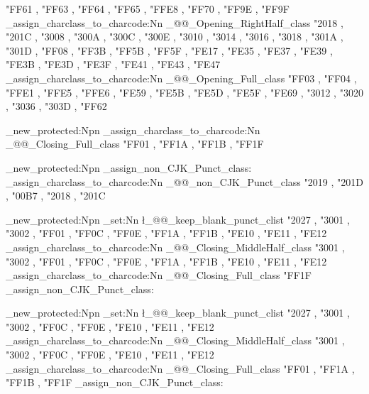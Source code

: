 {{%
        "FF61 , "FF63 , "FF64 , "FF65 , "FFE8 ,
        "FF70 , "FF9E , "FF9F
      }
    \@@_assign_charclass_to_charcode:Nn \g_@@_Opening_RightHalf_class
      {
        "2018 , "201C ,
        "3008 , "300A , "300C , "300E , "3010 ,
        "3014 , "3016 , "3018 , "301A , "301D ,
        "FF08 , "FF3B , "FF5B , "FF5F ,
        "FE17 , "FE35 , "FE37 , "FE39 , "FE3B ,
        "FE3D , "FE3F , "FE41 , "FE43 , "FE47
      }
    \@@_assign_charclass_to_charcode:Nn \g_@@_Opening_Full_class
      {
        "FF03 , "FF04 , "FFE1 , "FFE5 , "FFE6 ,
        "FE59 , "FE5B , "FE5D , "FE5F , "FE69 ,
        "3012 , "3020 , "3036 , "303D ,
        "FF62
      }
  }
\ChineseSimplifiedH

\cs_new_protected:Npn \ChineseSimplifiedV
  {
    \ChineseSimplifiedH
    \@@_assign_charclass_to_charcode:Nn \g_@@_Closing_Full_class
      {
        "FF01 , "FF1A , "FF1B , "FF1F
      }
  }

\cs_new_protected:Npn \@@_assign_non_CJK_Punct_class:
  {
    \@@_assign_charclass_to_charcode:Nn \g_@@_non_CJK_Punct_class
      {
        "2019 , "201D ,
        "00B7 ,
        "2018 , "201C
      }
  }

\cs_new_protected:Npn \ChineseTraditionalH
  {
    \ChineseSimplifiedH
    \clist_set:Nn \l_@@_keep_blank_punct_clist
      {
        "2027 ,
        "3001 , "3002 , "FF01 , "FF0C , "FF0E ,
        "FF1A , "FF1B ,
        "FE10 , "FE11 , "FE12
      }
    \@@_assign_charclass_to_charcode:Nn \g_@@_Closing_MiddleHalf_class
      {
        "3001 , "3002 , "FF01 , "FF0C , "FF0E ,
        "FF1A , "FF1B ,
        "FE10 , "FE11 , "FE12
      }
    \@@_assign_charclass_to_charcode:Nn \g_@@_Closing_Full_class
      {
        "FF1F
      }
    \@@_assign_non_CJK_Punct_class:
  }

\cs_new_protected:Npn \ChineseTraditionalV
  {
    \ChineseSimplifiedH
    \clist_set:Nn \l_@@_keep_blank_punct_clist
      {
        "2027 ,
        "3001 , "3002 , "FF0C , "FF0E ,
        "FE10 , "FE11 , "FE12
      }
    \@@_assign_charclass_to_charcode:Nn \g_@@_Closing_MiddleHalf_class
      {
        "3001 , "3002 , "FF0C , "FF0E ,
        "FE10 , "FE11 , "FE12
      }
    \@@_assign_charclass_to_charcode:Nn \g_@@_Closing_Full_class
      {
        "FF01 , "FF1A , "FF1B , "FF1F
      }
    \@@_assign_non_CJK_Punct_class:
  }

